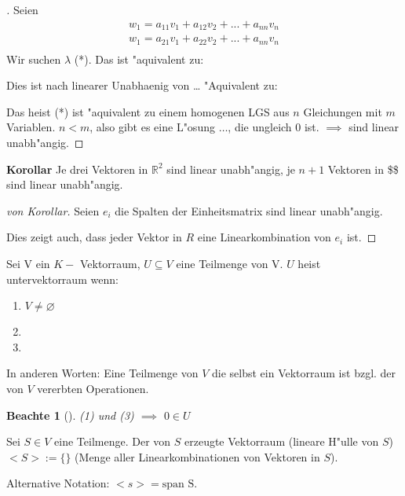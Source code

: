 \documentclass[11pt]{article}
\newtheorem*{notte}{Beachte}
\begin{document}
\begin{proof}[] \label{}
Seien 
\begin{align*}
w_1= a_{11} v_1 + a_{12} v_2 + ... + a_{nn} v_n \\
w_1= a_{21} v_1 + a_{22} v_2 + ... + a_{nn} v_n \\
\end{align*}
Wir suchen \(\lambda\) (*). Das ist "aquivalent zu:

Dies ist nach linearer Unabhaenig von \ldots{} "Aquivalent zu:

Das heist (*) ist "aquivalent zu einem homogenen LGS aus \(n\) Gleichungen mit \(m\)
Variablen. \(n<m\), also gibt es eine L"osung $\ldots{}$, die ungleich \(0\) ist. \(\implies\)
sind linear unabh"angig.
\end{proof}

\textbf{Korollar} Je drei Vektoren in \(\mathbb{R}^2\) sind linear unabh"angig, je \(n+1\)
Vektoren in \$\$ sind linear unabh"angig.

\begin{proof}[von Korollar] \label{}
Seien \(e_i\) die Spalten der Einheitsmatrix sind linear unabh"angig. 

Dies zeigt auch, dass jeder Vektor in \(R\) eine Linearkombination von \(e_i\) ist. 
\end{proof}

\begin{definition}{}{}
Sei V ein \(K-\) Vektorraum, \(U\subseteq V\) eine Teilmenge von V. \(U\) heist
untervektorraum wenn:
\begin{enumerate}
\item \(V\not= \varnothing\)
\item 

\item 
\end{enumerate}

In anderen Worten: Eine Teilmenge von \(V\) die selbst ein Vektorraum ist bzgl.
der von \(V\) vererbten Operationen.
\end{definition}

\begin{notte}[] \label{}
(1) und (3) \(\implies\) \(0\in U\)
\end{notte}

\begin{definition}{}{}
Sei \(S \in V\) eine Teilmenge. Der von \(S\) erzeugte Vektorraum (lineare H"ulle
von \(S\)) \(<S>:=\{\}\) (Menge aller Linearkombinationen von Vektoren in \(S\)).

Alternative Notation: \(<s>=\text{span S}\).
\end{definition}
\end{document}
